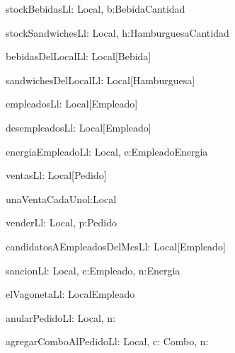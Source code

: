 
\begin{problema}{stockBebidasL}{l: Local, b:Bebida}{Cantidad}
\end{problema}

\begin{problema}{stockSandwichesL}{l: Local, h:Hamburguesa}{Cantidad}
\end{problema}

\begin{problema}{bebidasDelLocalL}{l: Local}{[Bebida]}
\end{problema}
	
\begin{problema}{sandwichesDelLocalL}{l: Local}{[Hamburguesa]}
\end{problema}

\begin{problema}{empleadosL}{l: Local}{[Empleado]}
\end{problema}

\begin{problema}{desempleadosL}{l: Local}{[Empleado]}
\end{problema}

\begin{problema}{energiaEmpleadoL}{l: Local, e:Empleado}{Energia}
\end{problema}

\begin{problema}{ventasL}{l: Local}{[Pedido]}
\end{problema}

\begin{problema}{unaVentaCadaUno}{l:Local}{\bool}
\end{problema}

\begin{problema}{venderL}{l: Local, p:Pedido}{}
\end{problema}

\begin{problema}{candidatosAEmpleadosDelMesL}{l: Local}{[Empleado]}
\end{problema}


\begin{problema}{sancionL}{l: Local, e:Empleado, n:Energia}{}
\end{problema}



\begin{problema}{elVagonetaL}{l: Local}{Empleado}
\end{problema}

\begin{problema}{anularPedidoL}{l: Local, n: \ent}{}
\end{problema}

\begin{problema}{agregarComboAlPedidoL}{l: Local, c: Combo, n:\ent}{}
 \end{problema}